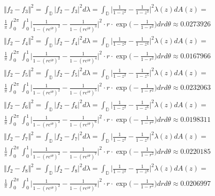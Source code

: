 \documentclass[12pt]{article}
\begin{document}
\begin{align}
&\Vert f_2 - f_{3}\Vert^2 = \int_\mathbb{D} \vert f_2 - f_{3} \vert^2 d\lambda = \int_\mathbb{D} \bigg\vert \frac{1}{1-z^2} - \frac{1}{1-z^{3}} \bigg\vert^2 \lambda(z) dA(z) =\\
&\frac{1}{\pi} \int_0^{2\pi} \int_0^1 \bigg\vert \frac{1}{1-(re^{i\theta})^2} - \frac{1}{1-(re^{i\theta})^{3}} \bigg\vert^2 \cdot r \cdot \exp\bigg(-\frac{1}{1-r^2}\bigg) dr d\theta \approx 0.0273926 \\
&\Vert f_2 - f_{4}\Vert^2 = \int_\mathbb{D} \vert f_2 - f_{4} \vert^2 d\lambda = \int_\mathbb{D} \bigg\vert \frac{1}{1-z^2} - \frac{1}{1-z^{4}} \bigg\vert^2 \lambda(z) dA(z) =\\
&\frac{1}{\pi} \int_0^{2\pi} \int_0^1 \bigg\vert \frac{1}{1-(re^{i\theta})^2} - \frac{1}{1-(re^{i\theta})^{4}} \bigg\vert^2 \cdot r \cdot \exp\bigg(-\frac{1}{1-r^2}\bigg) dr d\theta \approx 0.0167966 \\
&\Vert f_2 - f_{5}\Vert^2 = \int_\mathbb{D} \vert f_2 - f_{5} \vert^2 d\lambda = \int_\mathbb{D} \bigg\vert \frac{1}{1-z^2} - \frac{1}{1-z^{5}} \bigg\vert^2 \lambda(z) dA(z) =\\
&\frac{1}{\pi} \int_0^{2\pi} \int_0^1 \bigg\vert \frac{1}{1-(re^{i\theta})^2} - \frac{1}{1-(re^{i\theta})^{5}} \bigg\vert^2 \cdot r \cdot \exp\bigg(-\frac{1}{1-r^2}\bigg) dr d\theta \approx 0.0232063 \\
&\Vert f_2 - f_{6}\Vert^2 = \int_\mathbb{D} \vert f_2 - f_{6} \vert^2 d\lambda = \int_\mathbb{D} \bigg\vert \frac{1}{1-z^2} - \frac{1}{1-z^{6}} \bigg\vert^2 \lambda(z) dA(z) =\\
&\frac{1}{\pi} \int_0^{2\pi} \int_0^1 \bigg\vert \frac{1}{1-(re^{i\theta})^2} - \frac{1}{1-(re^{i\theta})^{6}} \bigg\vert^2 \cdot r \cdot \exp\bigg(-\frac{1}{1-r^2}\bigg) dr d\theta \approx 0.0198311 \\
&\Vert f_2 - f_{7}\Vert^2 = \int_\mathbb{D} \vert f_2 - f_{7} \vert^2 d\lambda = \int_\mathbb{D} \bigg\vert \frac{1}{1-z^2} - \frac{1}{1-z^{7}} \bigg\vert^2 \lambda(z) dA(z) =\\
&\frac{1}{\pi} \int_0^{2\pi} \int_0^1 \bigg\vert \frac{1}{1-(re^{i\theta})^2} - \frac{1}{1-(re^{i\theta})^{7}} \bigg\vert^2 \cdot r \cdot \exp\bigg(-\frac{1}{1-r^2}\bigg) dr d\theta \approx 0.0220185 \\
&\Vert f_2 - f_{8}\Vert^2 = \int_\mathbb{D} \vert f_2 - f_{8} \vert^2 d\lambda = \int_\mathbb{D} \bigg\vert \frac{1}{1-z^2} - \frac{1}{1-z^{8}} \bigg\vert^2 \lambda(z) dA(z) =\\
&\frac{1}{\pi} \int_0^{2\pi} \int_0^1 \bigg\vert \frac{1}{1-(re^{i\theta})^2} - \frac{1}{1-(re^{i\theta})^{8}} \bigg\vert^2 \cdot r \cdot \exp\bigg(-\frac{1}{1-r^2}\bigg) dr d\theta \approx 0.0206997 \\

\end{align}
\end{document}
